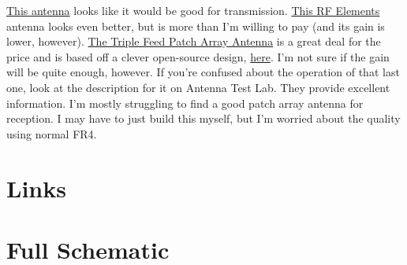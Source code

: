 \documentclass{default}
\newcounter{includepdfpage}
\begin{document}
\href{https://assets.lairdtech.com/home/brandworld/files/ANT-DS-PA58\%201115.pdf}{This antenna}
looks like it would be good for
transmission. \href{https://shop.bizsyscon.com/rf-elements-sh-cc-5-30-symmetrical-horn-carrier-class-30-degree.html#horizontalTab1}{This
  RF Elements} antenna looks even better, but is more than I'm willing to pay (and its gain is
lower,
however). \href{https://smile.amazon.com/d/Sewing-Machines-Accessories/9-4dBi-Triple-Antenna-Terminator-RJX1749/B074PR4TW3/ref=sr_1_8?ie=UTF8&qid=1544680544&sr=8-8&keywords=patch+antenna}{The
  Triple Feed Patch Array Antenna} is a great deal for the price and is based off a clever
open-source design,
\href{http://www.maartenbaert.be/quadcopters/antennas/triple-feed-patch-array-antenna/}{here}. I'm
not sure if the gain will be quite enough, however. If you're confused about the operation of that
last one, look at the description for it on Antenna Test Lab. They provide excellent
information. I'm mostly struggling to find a good patch array antenna for reception. I may have to
just build this myself, but I'm worried about the quality using normal FR4.

\chapter{Links}
\label{cha:links}


\chapter{Full Schematic}
\label{cha:schematic}


\end{document}
